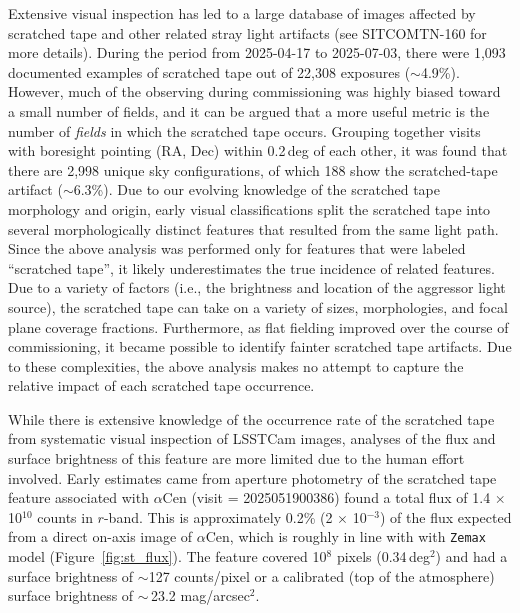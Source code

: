 \documentclass[SE,lsstdraft,authoryear,toc]{lsstdoc}
\begin{document}
Extensive visual inspection has led to a large database of images affected by scratched tape and other related stray light artifacts (see SITCOMTN-160 for more details). During the period from 2025-04-17 to 2025-07-03, there were 1,093 documented examples of scratched tape out of 22,308 exposures ($\sim$4.9\%). However, much of the observing during commissioning was highly biased toward a small number of fields, and it can be argued that a more useful metric is the number of \emph{fields} in which the scratched tape occurs. Grouping together visits with boresight pointing (RA, Dec) within 0.2\,deg of each other, it was found that there are 2,998 unique sky configurations, of which 188 show the scratched-tape artifact ($\sim$6.3\%). Due to our evolving knowledge of the scratched tape morphology and origin, early visual classifications split the scratched tape into several morphologically distinct features that resulted from the same light path. Since the above analysis was performed only for features that were labeled ``scratched tape'', it likely underestimates the true incidence of related features. Due to a variety of factors (i.e., the brightness and location of the aggressor light source), the scratched tape can take on a variety of sizes, morphologies, and focal plane coverage fractions.  Furthermore, as flat fielding improved over the course of commissioning, it became possible to identify fainter scratched tape artifacts. Due to these complexities, the above analysis makes no attempt to capture the relative impact of each scratched tape occurrence.

While there is extensive knowledge of the occurrence rate of the scratched tape from systematic visual inspection of LSSTCam images, analyses of the flux and surface brightness of this feature are more limited due to the human effort involved. Early estimates came from aperture photometry of the scratched tape feature associated with $\alpha$Cen (visit = 2025051900386) found a total flux of 1.4 $\times$ 10$^{10}$ counts in $r$-band. This is approximately 0.2\% (2 $\times$ 10$^{-3}$) of the flux expected from a direct on-axis image of $\alpha$Cen, which is roughly in line with with \texttt{Zemax} model (Figure~\ref{fig:st_flux}). The feature covered 10$^8$ pixels (0.34\,deg$^2$) and had a surface brightness of $\sim$127 counts/pixel or a calibrated (top of the atmosphere) surface brightness of $\sim$\,23.2 mag/arcsec$^2$.
\end{document}
